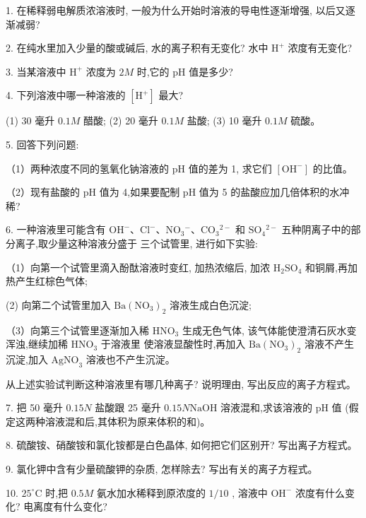 \documentclass[10pt]{article}
\begin{document}
1. 在稀释弱电解质浓溶液时, 一般为什么开始时溶液的导电性逐渐增强, 以后又逐渐减弱?

2. 在纯水里加入少量的酸或碱后, 水的离子积有无变化? 水中 \({\mathrm{H}}^{ + }\) 浓度有无变化?

3. 当某溶液中 \({\mathrm{H}}^{ + }\) 浓度为 \({2M}\) 时,它的 \(\mathrm{{pH}}\) 值是多少?

4. 下列溶液中哪一种溶液的 \(\left\lbrack {\mathrm{H}}^{ + }\right\rbrack\) 最大?

(1) 30 毫升 \({0.1M}\) 醋酸; (2) 20 毫升 \({0.1M}\) 盐酸; (3) 10 毫升 \({0.1M}\) 硫酸。

5. 回答下列问题:

（1）两种浓度不同的氢氧化钠溶液的 \(\mathrm{{pH}}\) 值的差为 1, 求它们 \(\left\lbrack {\mathrm{{OH}}}^{ - }\right\rbrack\) 的比值。

（2）现有盐酸的 \(\mathrm{{pH}}\) 值为 4,如果要配制 \(\mathrm{{pH}}\) 值为 5 的盐酸应加几倍体积的水冲稀?

6. 一种溶液里可能含有 \({\mathrm{{OH}}}^{ - }\text{、}{\mathrm{{Cl}}}^{ - }\text{、}{\mathrm{{NO}}}_{3}{}^{ - }\text{、}{\mathrm{{CO}}}_{3}{}^{2 - }\) 和 \({\mathrm{{SO}}}_{4}{}^{2 - }\) 五种阴离子中的部分离子,取少量这种溶液分盛于 三个试管里, 进行如下实验:

（1）向第一个试管里滴入酚酞溶液时变红, 加热浓缩后, 加浓 \({\mathrm{H}}_{2}{\mathrm{{SO}}}_{4}\) 和铜屑,再加热产生红棕色气体;

(2) 向第二个试管里加入 \(\mathrm{{Ba}}{\left( {\mathrm{{NO}}}_{3}\right) }_{2}\) 溶液生成白色沉淀;

（3）向第三个试管里逐渐加入稀 \({\mathrm{{HNO}}}_{3}\) 生成无色气体, 该气体能使澄清石灰水变浑浊,继续加稀 \({\mathrm{{HNO}}}_{3}\) 于溶液里 使溶液显酸性时,再加入 \(\mathrm{{Ba}}{\left( {\mathrm{{NO}}}_{3}\right) }_{2}\) 溶液不产生沉淀,加入 \({\mathrm{{AgNO}}}_{3}\) 溶液也不产生沉淀。

从上述实验试判断这种溶液里有哪几种离子? 说明理由, 写出反应的离子方程式。

7. 把 50 毫升 \({0.15N}\) 盐酸跟 25 毫升 \({0.15N}\mathrm{{NaOH}}\) 溶液混和,求该溶液的 \(\mathrm{{pH}}\) 值 (假定这两种溶液混和后,其体积为原来体积的和)。

8. 硫酸铵、硝酸铵和氯化铵都是白色晶体, 如何把它们区别开? 写出离子方程式。

9. 氯化钾中含有少量硫酸钾的杂质, 怎样除去? 写出有关的离子方程式。

10. \({25}^{ \circ }\mathrm{C}\) 时,把 \({0.5M}\) 氨水加水稀释到原浓度的 \(1/{10}\) , 溶液中 \({\mathrm{{OH}}}^{ - }\) 浓度有什么变化? 电离度有什么变化?
\end{document}
